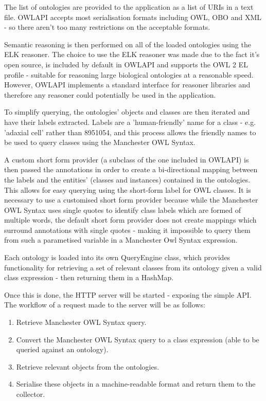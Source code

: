 \documentclass{article}
\begin{document}
The list of ontologies are provided to the application as a list of
URIs in a text file. OWLAPI accepts most serialisation formats including OWL,
OBO and XML - so there aren't too many restrictions on the acceptable formats. 

Semantic reasoning is then performed on all of the loaded ontologies using the
ELK reasoner. The choice to use the ELK reasoner was made due to the fact it's
open source, is included by default in OWLAPI and supports the OWL 2 EL profile
- suitable for reasoning large biological ontologies at a reasonable speed. 
However, OWLAPI implements a standard interface for reasoner libraries and 
therefore any reasoner could potentially be used in the application.

To simplify querying, the ontologies' objects and classes are then iterated and
have their labels extracted. Labels are a 'human-friendly' name for a class -
e.g. 'adaxial cell' rather than 8951054, and this process allows the friendly
names to be used to query classes using the Manchester OWL Syntax. 

A custom short form provider (a subclass of the one included in OWLAPI) is then 
passed the annotations in order to create a bi-directional mapping between the
labels and the entities' (classes and instances) contained in the ontologies.
This allows for easy querying using the short-form label for OWL classes. It is
necessary to use a customised short form provider because while the Manchester
OWL Syntax uses single quotes to identify class labels which are formed of
multiple words, the default short form provider does not create mappings which
surround annotations with single quotes - making it impossible to query them
from such a parametised variable in a Manchester Owl Syntax expression.

Each ontology is loaded into its own QueryEngine class, which provides
functionality for retrieving a set of relevant classes from its ontology given a
valid class expression - then returning them in a HashMap.

Once this is done, the HTTP server will be started - exposing the simple API. 
The workflow of a request made to the server will be as follows:

\begin{enumerate}
    \item Retrieve Manchester OWL Syntax query.
    \item Convert the Manchester OWL Syntax query to a class expression (able to
    be queried against an ontology).
    \item Retrieve relevant objects from the ontologies.
    \item Serialise these objects in a machine-readable format and return them 
    to the collector.
\end{enumerate}
\end{document}
